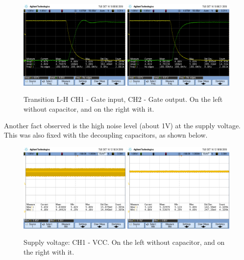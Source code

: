 \begin{figure}[H]
    \begin{centering}
    \includegraphics[width=0.49\textwidth]{data/ej4_circuit100k1}
    \includegraphics[width=0.49\textwidth]{data/ej4_circuit100kcap}
    \par\end{centering}
    \caption{Transition L-H CH1 - Gate input, CH2 - Gate output. On the left
    without capacitor, and on the right with it.}
\end{figure}
\newpage
Another fact observed is the high noise level
(about 1V) at 
the supply voltage. This was also fixed with the 
decoupling capacitors, as shown below.

\begin{figure}[H]
    \begin{centering}
    \includegraphics[width=0.49\textwidth]{data/ej4_circuit100ksinc}
    \includegraphics[width=0.49\textwidth]{data/ej4_circuit100kconc1}
    \par\end{centering}
    \caption{Supply voltage: CH1 - VCC. On the left
    without capacitor, and on the right with it.}
\end{figure}
